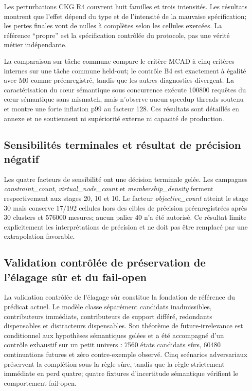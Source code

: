 \documentclass[journal]{IEEEtran}
\begin{document}
Les perturbations CKG R4 couvrent huit familles et trois intensités. Les résultats montrent que l'effet dépend du type et de l'intensité de la mauvaise spécification; les pertes finales vont de nulles à complètes selon les cellules exercées. La référence ``propre'' est la spécification contrôlée du protocole, pas une vérité métier indépendante.



La comparaison sur tâche commune compare le critère MCAD à cinq critères internes sur une tâche commune held-out; le contrôle B4 est exactement à égalité avec M0 comme préenregistré, tandis que les autres diagnostics divergent. La caractérisation du cœur sémantique sous concurrence exécute 100800 requêtes du cœur sémantique sans mismatch, mais n'observe aucun speedup threads soutenu et montre une forte inflation p99 au facteur 128. Ces résultats sont détaillés en annexe et ne soutiennent ni supériorité externe ni capacité de production.

\subsection{Sensibilités terminales et résultat de précision négatif}

Les quatre facteurs de sensibilité ont une décision terminale gelée. Les campagnes \emph{constraint\_count}, \emph{virtual\_node\_count} et \emph{membership\_density} ferment respectivement aux stages 20, 10 et 10. Le facteur \emph{objective\_count} atteint le stage 30 mais conserve 17/192 cellules hors des cibles de précision préenregistrées après 30 clusters et 576000 mesures; aucun palier 40 n'a été autorisé. Ce résultat limite explicitement les interprétations de précision et ne doit pas être remplacé par une extrapolation favorable.



\subsection{Validation contrôlée de préservation de l'élagage sûr et du fail-open}

La validation contrôlée de l'élagage sûr constitue la fondation de référence du prédicat actuel. Le modèle classe séparément candidats inadmissibles, contributeurs immédiats, contributeurs de support différé, redondants dispensables et distracteurs dispensables. Son théorème de future-irrelevance est conditionnel aux hypothèses sémantiques gelées et a été accompagné d'un contrôle exhaustif sur un petit univers : 7560 états candidats sûrs, 60480 continuations futures et zéro contre-exemple observé. Cinq scénarios adversariaux préservent la complétion sous la règle sûre, tandis que la règle strictement immédiate en perd quatre; quatre fixtures d'incertitude sémantique vérifient le comportement fail-open.
\end{document}
